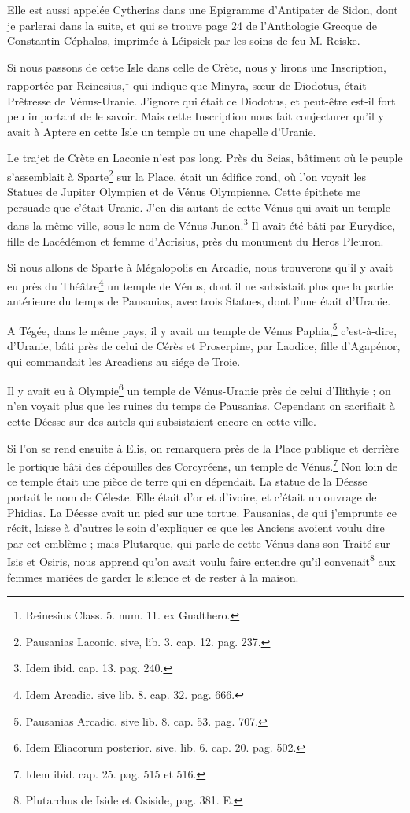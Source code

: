 \documentclass[a4paper, 11pt, oneside, polutonikogreek, french]{article}
\begin{document}
Elle est aussi appelée Cytherias dans une Epigramme d'Antipater de Sidon, dont je parlerai dans la suite, et qui se trouve page 24 de l'Anthologie Grecque de Constantin Céphalas, imprimée à Léipsick par les soins de feu M. Reiske.

Si nous passons de cette Isle dans celle de Crète, nous y lirons une Inscription, rapportée par Reinesius,\footnote{Reinesius Class. 5. num. 11. ex Gualthero.} qui indique que Minyra, sœur de Diodotus, était Prêtresse de Vénus-Uranie. J'ignore qui était ce Diodotus, et peut-être est-il fort peu important de le savoir. Mais cette Inscription nous fait conjecturer qu'il y avait à Aptere en cette Isle un temple ou une chapelle d'Uranie.

Le trajet de Crète en Laconie n'est pas long. Près du Scias, bâtiment où le peuple s'assemblait à Sparte\footnote{Pausanias Laconic. sive, lib. 3. cap. 12. pag. 237.} sur la Place, était un édifice rond, où l'on voyait les Statues de Jupiter Olympien et de Vénus Olympienne. Cette épithete me persuade que c'était Uranie. J'en dis autant de cette Vénus qui avait un temple dans la même ville, sous le nom de Vénus-Junon.\footnote{Idem ibid. cap. 13. pag. 240.} Il avait été bâti par Eurydice, fille de Lacédémon et femme d'Acrisius, près du monument du Heros Pleuron.

Si nous allons de Sparte à Mégalopolis en Arcadie, nous trouverons qu'il y avait eu près du Théâtre\footnote{Idem Arcadic. sive lib. 8. cap. 32. pag. 666.} un temple de Vénus, dont il ne subsistait plus que la partie antérieure du temps de Pausanias, avec trois Statues, dont l'une était d'Uranie.

A Tégée, dans le même pays, il y avait un temple de Vénus Paphia,\footnote{Pausanias Arcadic. sive lib. 8. cap. 53. pag. 707.} c'est-à-dire, d'Uranie, bâti près de celui de Cérès et Proserpine, par Laodice, fille d'Agapénor, qui commandait les Arcadiens au siége de Troie.

Il y avait eu à Olympie\footnote{Idem Eliacorum posterior. sive. lib. 6. cap. 20. pag. 502.} un temple de Vénus-Uranie près de celui d'Ilithyie ; on n'en voyait plus que les ruines du temps de Pausanias. Cependant on sacrifiait à cette Déesse sur des autels qui subsistaient encore en cette ville.

Si l'on se rend ensuite à Elis, on remarquera près de la Place publique et derrière le portique bâti des dépouilles des Corcyréens, un temple de Vénus.\footnote{Idem ibid. cap. 25. pag. 515 et 516.} Non loin de ce temple était une pièce de terre qui en dépendait. La statue de la Déesse portait le nom de Céleste. Elle était d'or et d'ivoire, et c'était un ouvrage de Phidias. La Déesse avait un pied sur une tortue. Pausanias, de qui j'emprunte ce récit, laisse à d'autres le soin d'expliquer ce que les Anciens avoient voulu dire par cet emblème ; mais Plutarque, qui parle de cette Vénus dans son Traité sur Isis et Osiris, nous apprend qu'on avait voulu faire entendre qu'il convenait\footnote{Plutarchus de Iside et Osiside, pag. 381. E.} aux femmes mariées de garder le silence et de rester à la maison.
\end{document}
